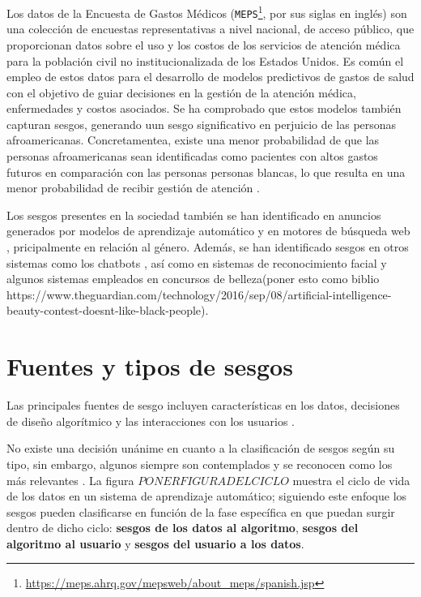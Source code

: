     Los datos de la Encuesta de Gastos M\'edicos (\texttt{MEPS}\footnote{\url{https://meps.ahrq.gov/mepsweb/about_meps/spanish.jsp}}, 
    por sus siglas en ingl\'es) son una colecci\'on de encuestas representativas a nivel nacional, de acceso p\'ublico, que proporcionan 
    datos sobre el uso y los costos de los servicios de atenci\'on m\'edica para la poblaci\'on civil no institucionalizada de los Estados Unidos. 
    Es com\'un el empleo de estos datos para el desarrollo de modelos predictivos de gastos de salud con el objetivo de guiar decisiones 
    en la gesti\'on de la atenci\'on m\'edica, enfermedades y costos asociados. Se ha comprobado que estos modelos tambi\'en capturan sesgos, 
    generando uun sesgo significativo en perjuicio de las personas afroamericanas. Concretamentea, existe una menor probabilidad de que 
    las personas afroamericanas sean identificadas como pacientes con altos gastos futuros en comparaci\'on con las personas personas blancas, 
    lo que resulta en una menor probabilidad de recibir gesti\'on de atenci\'on \parencite{understanding}.

    Los sesgos presentes en la sociedad tambi\'en se han identificado en anuncios generados por modelos de aprendizaje autom\'atico
    \parencite{sweeney2013discrimination,datta2015automated} y en motores de b\'usqueda web \parencite{unequal_rep}, pricipalmente en relaci\'on al 
    g\'enero. Adem\'as, se han identificado sesgos en otros sistemas como los chatbots \parencite{chatbot_bias}, as\'i como en sistemas de 
    reconocimiento facial \parencite{facial_bias} y algunos sistemas empleados en concursos de belleza(poner esto como biblio
    https://www.theguardian.com/technology/2016/sep/08/artificial-intelligence-beauty-contest-doesnt-like-black-people).

\section{Fuentes y tipos de sesgos}

    Las principales fuentes de sesgo incluyen caracter\'isticas en los datos, decisiones de dise\~no algor\'itmico y las interacciones 
    con los usuarios \parencite{resp_data}.
    
    No existe una decisi\'on un\'anime en cuanto a la clasificaci\'on de sesgos seg\'un su tipo, sin embargo, 
    algunos siempre son contemplados y se reconocen como los m\'as relevantes \parencite{survey}. La figura $PONER FIGURA DEL CICLO$ muestra 
    el ciclo de vida de los datos en un sistema de aprendizaje autom\'atico; siguiendo este enfoque los sesgos pueden clasificarse 
    en funci\'on de la fase espec\'ifica en que puedan surgir dentro de dicho ciclo: \textbf{sesgos de los datos al algoritmo}, 
    \textbf{sesgos del algoritmo al usuario} y \textbf{sesgos del usuario a los datos}.
    
